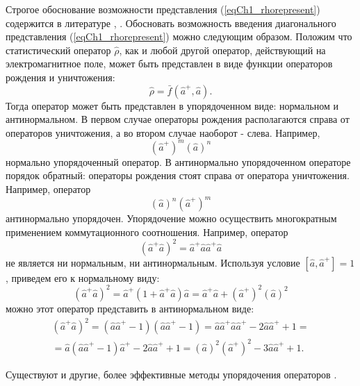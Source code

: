 Строгое обоснование возможности представления (\ref{eqCh1_rhorepresent})
содержится в литературе \cite{bQuantumOpticsAndRadioPhisicsLecture1966},
\cite{bKaluderSudershan1970}. 
Обосновать возможность введения диагонального представления
(\ref{eqCh1_rhorepresent}) можно следующим образом. Положим что
статистический оператор $\hat{\rho}$, как и любой другой оператор,
действующий на электромагнитное поле, может быть представлен в виде
функции операторов рождения и уничтожения:
\[
\hat{\rho} = \bar{f}\left(\hat{a}^{+}, \hat{a}\right).
\]
Тогда оператор может быть представлен в упорядоченном виде: нормальном
и антинормальном. В первом случае операторы рождения располагаются
справа от операторов уничтожения, а во втором случае наоборот - слева.
Например, 
\[
\left(\hat{a}^{+}\right)^m\left(\hat{a}\right)^n
\]
нормально упорядоченный оператор. В антинормально упорядоченном
операторе порядок обратный: операторы рождения стоят справа от
оператора уничтожения. Например, оператор 
\[
\left(\hat{a}\right)^n\left(\hat{a}^{+}\right)^m
\]
антинормально упорядочен. Упорядочение можно осуществить многократным
применением коммутационного соотношения. Например, оператор  
\[
\left(\hat{a}^{+}\hat{a}\right)^2 =
\hat{a}^{+}\hat{a}\hat{a}^{+}\hat{a} 
\]
не является ни нормальным, ни антинормальным. Используя условие 
$\left[\hat{a},\hat{a}^{+}\right] = 1$,
приведем его к нормальному виду: 
\[
\left(\hat{a}^{+}\hat{a}\right)^2 = \hat{a}^{+}\left(1 +
\hat{a}^{+}\hat{a}\right)\hat{a} = 
\hat{a}^{+}\hat{a} + \left(\hat{a}^{+}\right)^2\left(\hat{a}\right)^2
\]
можно этот оператор представить в антинормальном виде:
\begin{eqnarray}
\left(\hat{a}^{+}\hat{a}\right)^2 = 
\left(\hat{a}\hat{a}^{+} - 1\right) \left(\hat{a}\hat{a}^{+} -
1\right) = \hat{a}\hat{a}^{+} \hat{a}\hat{a}^{+} - 2
\hat{a}\hat{a}^{+} + 1 =
\nonumber \\
= \hat{a}\left(\hat{a}\hat{a}^{+} - 1\right)\hat{a}^{+} -
2\hat{a}\hat{a}^{+} + 1 = 
\left(\hat{a}\right)^2\left(\hat{a}^{+}\right)^2 - 3
\hat{a}\hat{a}^{+} + 1.
\nonumber
\end{eqnarray}

Существуют и другие, более эффективные методы упорядочения операторов
\cite{bLuisell1972}.


